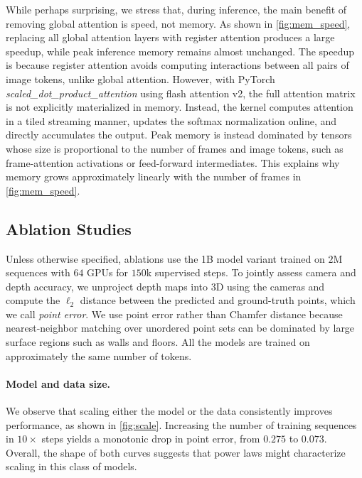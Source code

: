While perhaps surprising, we stress that, during inference, the main benefit of removing global attention is speed, not memory.
As shown in \cref{fig:mem_speed}, replacing all global attention layers with register attention produces a large speedup, while peak inference memory remains almost unchanged. 
The speedup is because register attention avoids computing interactions between all pairs of image tokens, unlike global attention.
However, with PyTorch \textit{scaled\_dot\_product\_attention} using flash attention v2, the full attention matrix is not explicitly materialized in memory. 
Instead, the kernel computes attention in a tiled streaming manner, updates the softmax normalization online, and directly accumulates the output.
Peak memory is instead dominated by tensors whose size is proportional to the number of frames and image tokens, such as frame-attention activations or feed-forward intermediates.
This explains why memory grows approximately linearly with the number of frames in \cref{fig:mem_speed}. 



\subsection{Ablation Studies}

Unless otherwise specified, ablations use the 1B model variant trained on $2$M sequences with $64$ GPUs for $150$k supervised steps.
To jointly assess camera and depth accuracy, we unproject depth maps into 3D using the cameras and compute the $\ell_2$ distance between the predicted and ground-truth points, which we call \emph{point error}.
We use point error rather than Chamfer distance because nearest-neighbor matching over unordered point sets can be dominated by large surface regions such as walls and floors.
All the models are trained on approximately the same number of tokens.

\paragraph{Model and data size.}

We observe that scaling either the model or the data consistently improves performance, as shown in \cref{fig:scale}.
Increasing the number of training sequences in $10\times$ steps yields a monotonic drop in point error, from $0.275$ to $0.073$.
Overall, the shape of both curves suggests that power laws might characterize scaling in this class of models.

